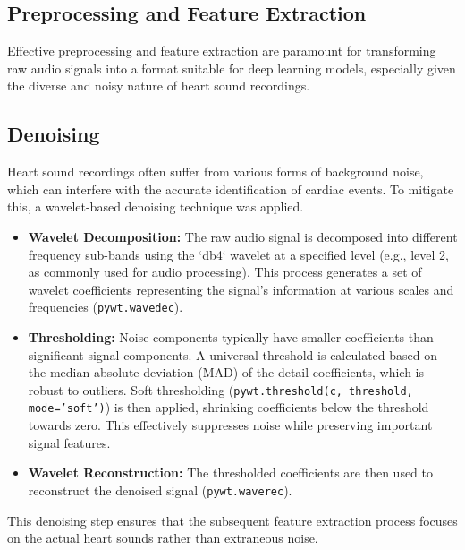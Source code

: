 \documentclass[a4paper]{article}
\begin{document}
\begin{multicols}{2}
\section{Preprocessing and Feature Extraction}
Effective preprocessing and feature extraction are paramount for transforming raw audio signals into a format suitable for deep learning models, especially given the diverse and noisy nature of heart sound recordings.

\subsection{Denoising}
Heart sound recordings often suffer from various forms of background noise, which can interfere with the accurate identification of cardiac events. To mitigate this, a wavelet-based denoising technique was applied.
\begin{itemize}
    \item \textbf{Wavelet Decomposition:} The raw audio signal is decomposed into different frequency sub-bands using the `db4` wavelet at a specified level (e.g., level 2, as commonly used for audio processing). This process generates a set of wavelet coefficients representing the signal's information at various scales and frequencies (\texttt{pywt.wavedec}).
    \item \textbf{Thresholding:} Noise components typically have smaller coefficients than significant signal components. A universal threshold is calculated based on the median absolute deviation (MAD) of the detail coefficients, which is robust to outliers. Soft thresholding (\texttt{pywt.threshold(c, threshold, mode='soft')}) is then applied, shrinking coefficients below the threshold towards zero. This effectively suppresses noise while preserving important signal features.
    \item \textbf{Wavelet Reconstruction:} The thresholded coefficients are then used to reconstruct the denoised signal (\texttt{pywt.waverec}).
\end{itemize}
This denoising step ensures that the subsequent feature extraction process focuses on the actual heart sounds rather than extraneous noise.


\end{multicols}
\end{document}
